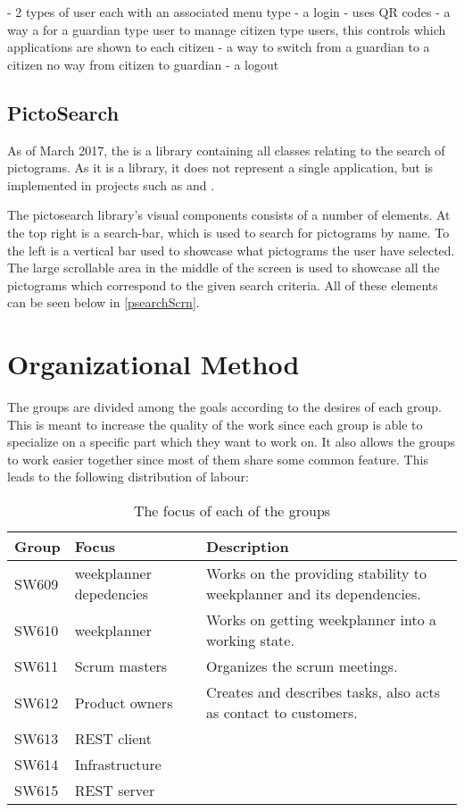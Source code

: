 - 2 types of user each with an associated menu type
- a login - uses QR codes
- a way a for a guardian type user to manage citizen type users, this
controls which applications are shown to each citizen
- a way to switch from a guardian to a citizen no way from citizen to guardian
- a logout


\subsection{PictoSearch}
As of March 2017, the  is a library containing all
classes relating to the search of pictograms. As it is a library, it does not
represent a single application, but is implemented in projects such as
 and .\nl

The pictosearch library's visual components consists of a number of
elements. At the top right is a search-bar, which is used to search for
pictograms by name. To the left is a vertical bar used to showcase what
pictograms the user have selected. The large scrollable area in the middle of
the screen is used to showcase all the pictograms which correspond to the given
search criteria. All of these elements can be seen below in
\autoref{psearchScrn}.


\section{Organizational Method}

The groups are divided among the goals according to the desires of each group.
This is meant to increase the quality of the work since each group is able to
specialize on a specific part which they want to work on. It also allows the
groups to work easier together since most of them share some common feature.
This leads to the following distribution of labour:

\begin{table}[H]
\centering
\begin{tabular}{|p{2cm}|p{3cm}|p{8cm}|}
\hline
Group & Focus & Description \\ \hline
SW609 & weekplanner depedencies & Works on the providing stability to
weekplanner and its dependencies.\\\hline 
SW610 & weekplanner & Works on getting weekplanner into a working
state.\\\hline 
SW611 & Scrum masters & Organizes the scrum meetings. \\\hline 
SW612 & Product owners & Creates and describes tasks, also acts as contact to
customers. \\\hline 
SW613 & REST client & \\ \hline

SW614 & Infrastructure & \\ \hline

SW615 & REST server & \\ \hline

\end{tabular}
\caption{The focus of each of the groups}
\label{GroupDivision}
\end{table}

